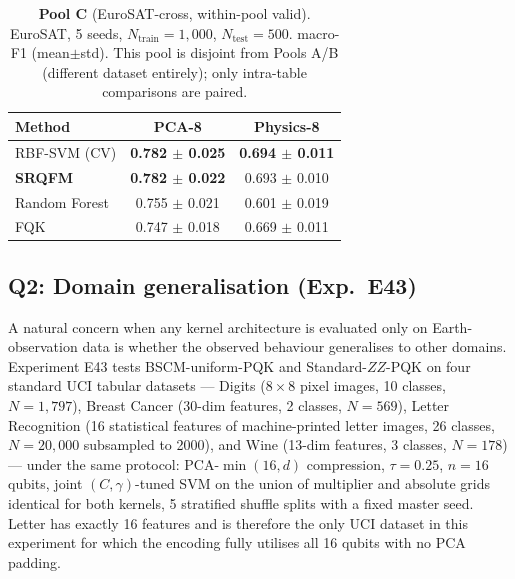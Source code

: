 \documentclass[pdflatex,sn-mathphys]{sn-jnl}
\theoremstyle{plain}
\theoremstyle{remark}
\theoremstyle{definition}
\begin{document}
\begin{table}[htbp]
\caption{\textbf{Pool C} (EuroSAT-cross, within-pool valid). EuroSAT, 5 seeds, $N_\text{train}=1{,}000$, $N_\text{test}=500$. macro-F1 (mean$\pm$std).  This pool is disjoint from Pools A/B (different dataset entirely); only intra-table comparisons are paired.}
\label{tab:eurosat-cross}
\begin{tabular}{lcc}
\toprule
Method & PCA-8 & Physics-8 \\
\midrule
RBF-SVM (CV)   & \textbf{0.782 $\pm$ 0.025} & \textbf{0.694 $\pm$ 0.011} \\
\textbf{SRQFM} & \textbf{0.782 $\pm$ 0.022} & 0.693 $\pm$ 0.010 \\
Random Forest  & 0.755 $\pm$ 0.021 & 0.601 $\pm$ 0.019 \\
FQK            & 0.747 $\pm$ 0.018 & 0.669 $\pm$ 0.011 \\
\bottomrule
\end{tabular}
\end{table}

\subsection{Q2: Domain generalisation (Exp.\ E43)}\label{sec:domain-gen}

A natural concern when any kernel architecture is evaluated only on Earth-observation data is whether the observed behaviour generalises to other domains. Experiment E43 tests BSCM-uniform-PQK and Standard-$ZZ$-PQK on four standard UCI tabular datasets --- Digits ($8{\times}8$ pixel images, 10 classes, $N=1{,}797$), Breast Cancer (30-dim features, 2 classes, $N=569$), Letter Recognition \cite{frey1991letter} (16 statistical features of machine-printed letter images, 26 classes, $N=20{,}000$ subsampled to 2000), and Wine (13-dim features, 3 classes, $N=178$) --- under the same protocol: PCA-$\min(16, d)$ compression, $\tau=0.25$, $n=16$ qubits, joint $(C, \gamma)$-tuned SVM on the union of multiplier and absolute grids identical for both kernels, 5 stratified shuffle splits with a fixed master seed.  Letter has exactly 16 features and is therefore the only UCI dataset in this experiment for which the encoding fully utilises all 16 qubits with no PCA padding.
\end{document}
